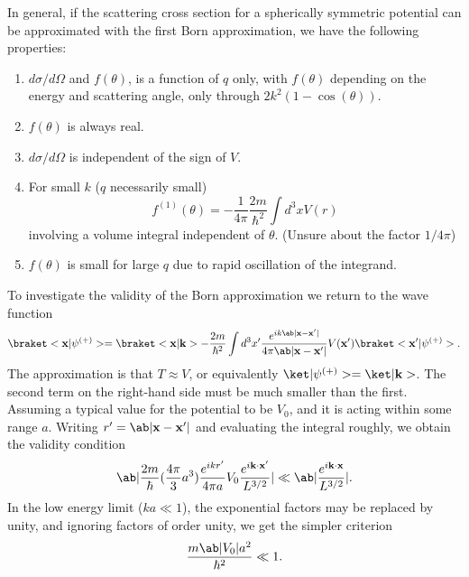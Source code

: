 In general, if the scattering cross section for a spherically symmetric potential can be approximated with the first Born approximation, we have the following properties:
\begin{enumerate}
    \item $d\sigma/d\Omega$ and $f(\theta)$, is a function of $q$ only, with $f(\theta)$ depending on the energy and scattering angle, only through $2k^2 (1-\cos(\theta))$.
    \item $f(\theta)$ is always real.
    \item $d\sigma/d\Omega$ is independent of the sign of $V$.
    \item For small $k$ ($q$ necessarily small)
            \begin{equation}
                f^{(1)}(\theta) = -\frac{1}{4\pi} \frac{2m}{\hbar^2} \int d^3 x V(r)
            \end{equation}
    involving a volume integral independent of $\theta$. (Unsure about the factor $1/4\pi$)
    \item $f(\theta)$ is small for large $q$ due to rapid oscillation of the integrand.
\end{enumerate}

To investigate the validity of the Born approximation we return to the wave function
\begin{equation}
    \bk{\vec{x}}{\psi^{(+)}} = \bk{\vec{x}}{\vec{k}} - \frac{2m}{\hbar^2} \int d^3 x' \frac{e^{i k \abs{\vec{x} - \vec{x}'}}}{4\pi \abs{\vec{x}- \vec{x}'}} V(\vec{x}') \bk{\vec{x}'}{\psi^{(+)}}.
\end{equation}
The approximation is that $T\approx V$, or equivalently $\k{\psi^{(+)}} = \k{\vec{k}}$. The second term on the right-hand side must be much smaller than the first. Assuming a typical value for the potential to be $V_0$, and it is acting within some range $a$. Writing $r' = \abs{\vec{x} - \vec{x}'}$ and evaluating the integral roughly, we obtain the validity condition
\begin{equation}
    \abs{\frac{2m}{\hbar} (\frac{4\pi}{3}a^3)\frac{e^{ikr'}}{4\pi a} V_0 \frac{e^{i \vec{k}\cdot\vec{x}'}}{L^{3/2}}} \ll \abs{\frac{e^{i\vec{k}\cdot\vec{x}}}{L^{3/2}}}.
\end{equation}
In the low energy limit ($ka \ll 1$), the exponential factors may be replaced by unity, and ignoring factors of order unity, we get the simpler criterion
\begin{equation}
    \frac{m\abs{V_0}a^2}{\hbar^2} \ll 1.
\end{equation}

